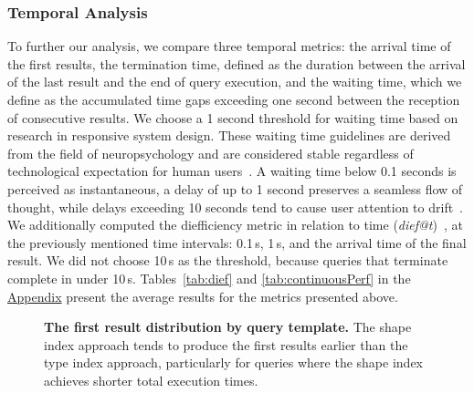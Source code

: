 \subsubsection{Temporal Analysis}
To further our analysis, we compare three temporal metrics: the arrival time of the first results, the termination time, defined as the duration between the arrival of the last result and the end of query execution, and the waiting time, which we define as the accumulated time gaps exceeding one second between the reception of consecutive results.
We choose a 1 second threshold for waiting time based on research in responsive system design.
These waiting time guidelines are derived from the field of neuropsychology and are considered stable regardless of technological expectation for human users~\cite{uxtigersNeedSpeed, Nielsen1993}.
A waiting time below 0.1 seconds is perceived as instantaneous, a delay of up to 1 second preserves a seamless flow of thought, while delays exceeding 10 seconds tend to cause user attention to drift~\cite{Nielsen1993}.
We additionally computed the diefficiency metric in relation to time (\textit{dief@t})~\cite{Acosta2017}, at the previously mentioned time intervals: 0.1\,s, 1\,s, and the arrival time of the final result.
We did not choose 10\,s as the threshold, because queries that terminate complete in under 10\,s.
Tables~\ref{tab:dief} and \ref{tab:continuousPerf} in the \hyperref[sec:appendix]{Appendix} present the average results for the metrics presented above.

\begin{figure}
	\centering
	\def\svgwidth{\linewidth}
	
	\caption{
		\textbf{The first result distribution by query template.}
		The shape index approach tends to produce the first results earlier than the type index approach, particularly for queries where the shape index achieves shorter total execution times.}
	\label{fig:first_res}
\end{figure}

